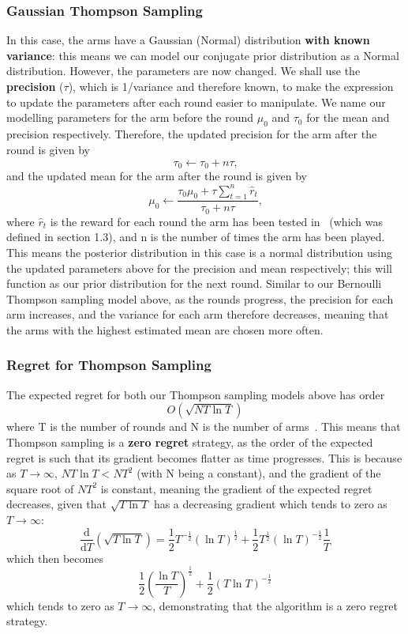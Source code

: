 \subsubsection{Gaussian Thompson Sampling}
In this case, the arms have a Gaussian (Normal) distribution \textbf{with known variance}: this means we can model our conjugate prior distribution as a Normal distribution.
However, the parameters are now changed.
We shall use the \textbf{precision} ($\tau$), which is 1/variance and therefore known, to make the expression to update the parameters after each round easier to manipulate.
We name our modelling parameters for the arm before the round $\mu_0$ and $\tau_0$ for the mean and precision respectively.
Therefore, the updated precision for the arm after the round is given by
\[\tau_0\xleftarrow{}\tau_0 + n\tau\text{,}\]
and the updated mean for the arm after the round is given by
\[\mu_0\xleftarrow{}\frac{\tau_0\mu_0 + \tau\sum_{t=1}^n\widehat{r}_t}{\tau_0 + n\tau}\text{,}\]
where $\widehat{r}_t$ is the reward for each round the arm has been tested in~\citep{agrawal2013further} (which was defined in section 1.3), and n is the number of times the arm has been played.
This means the posterior distribution in this case is a normal distribution using the updated parameters above for the precision and mean respectively;
this will function as our prior distribution for the next round.
Similar to our Bernoulli Thompson sampling model above, as the rounds progress, the precision for each arm increases, and the variance for each arm therefore decreases, meaning that the arms with the highest estimated mean are chosen more often.
\subsubsection{Regret for Thompson Sampling}
The expected regret for both our Thompson sampling models above has order
\[O\left(\sqrt{NT\ln{T}}\right)\]
where T is the number of rounds and N is the number of arms~\citep{agrawal2013further}.
This means that Thompson sampling is a \textbf{zero regret} strategy, as the order of the expected regret is such that its gradient becomes flatter as time progresses.
This is because as $T\to\infty$, $NT\ln{T} < NT^2$ (with N being a constant), and the gradient of the square root of $NT^2$ is constant, meaning the gradient of the expected regret decreases, given that $\sqrt{T\ln{T}}$ has a decreasing gradient which tends to zero as $T\to\infty$:
\newline
\[\frac{\mathrm{d} }{\mathrm{d} T} (\sqrt{T \ln{T}}) = \frac{1}{2}T^{-\frac{1}{2}}(\ln{T})^\frac{1}{2} + \frac{1}{2}T^{\frac{1}{2}}(\ln{T})^{-\frac{1}{2}}\frac{1}{T}\]
which then becomes
\newline
\[ \frac{1}{2}\left(\frac{\ln{T}}{T}\right)^\frac{1}{2} + \frac{1}{2}(T\ln{T})^{-\frac{1}{2}} \]
\newline
which tends to zero as $T\to\infty$, demonstrating that the algorithm is a zero regret strategy.


